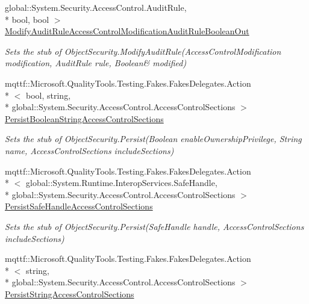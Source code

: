 \begin{DoxyCompactItemize}
global\-::\-System.\-Security.\-Access\-Control.\-Audit\-Rule, \\*
bool, bool $>$ \hyperlink{class_system_1_1_security_1_1_access_control_1_1_fakes_1_1_stub_object_security_a906a1056f24faec454585a18b4f6c80b}{Modify\-Audit\-Rule\-Access\-Control\-Modification\-Audit\-Rule\-Boolean\-Out}
\begin{DoxyCompactList}\small\item\em Sets the stub of Object\-Security.\-Modify\-Audit\-Rule(Access\-Control\-Modification modification, Audit\-Rule rule, Boolean\& modified)\end{DoxyCompactList}\item 
mqttf\-::\-Microsoft.\-Quality\-Tools.\-Testing.\-Fakes.\-Fakes\-Delegates.\-Action\\*
$<$ bool, string, \\*
global\-::\-System.\-Security.\-Access\-Control.\-Access\-Control\-Sections $>$ \hyperlink{class_system_1_1_security_1_1_access_control_1_1_fakes_1_1_stub_object_security_a77c7aff6ae7f3250cfdd08a4394b10dd}{Persist\-Boolean\-String\-Access\-Control\-Sections}
\begin{DoxyCompactList}\small\item\em Sets the stub of Object\-Security.\-Persist(\-Boolean enable\-Ownership\-Privilege, String name, Access\-Control\-Sections include\-Sections)\end{DoxyCompactList}\item 
mqttf\-::\-Microsoft.\-Quality\-Tools.\-Testing.\-Fakes.\-Fakes\-Delegates.\-Action\\*
$<$ global\-::\-System.\-Runtime.\-Interop\-Services.\-Safe\-Handle, \\*
global\-::\-System.\-Security.\-Access\-Control.\-Access\-Control\-Sections $>$ \hyperlink{class_system_1_1_security_1_1_access_control_1_1_fakes_1_1_stub_object_security_acc891e4ff132857f01e38e92db6ef082}{Persist\-Safe\-Handle\-Access\-Control\-Sections}
\begin{DoxyCompactList}\small\item\em Sets the stub of Object\-Security.\-Persist(\-Safe\-Handle handle, Access\-Control\-Sections include\-Sections)\end{DoxyCompactList}\item 
mqttf\-::\-Microsoft.\-Quality\-Tools.\-Testing.\-Fakes.\-Fakes\-Delegates.\-Action\\*
$<$ string, \\*
global\-::\-System.\-Security.\-Access\-Control.\-Access\-Control\-Sections $>$ \hyperlink{class_system_1_1_security_1_1_access_control_1_1_fakes_1_1_stub_object_security_a43b93709ab2c7aac6384523ab7a9bd36}{Persist\-String\-Access\-Control\-Sections}

\end{DoxyCompactItemize}
